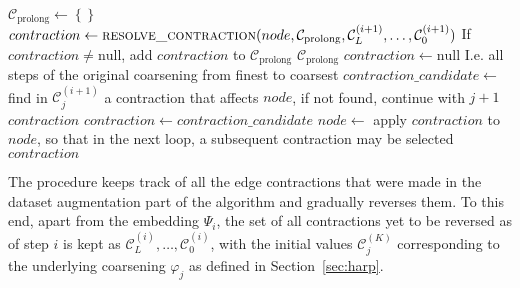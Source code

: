 \begin{algorithm*}
\begin{algorithmic}
    \EndFunction
    \Statex
        \State $ \mathcal{C}_\mathrm{prolong} \gets \left\{ \right\} $
            \State $ contraction \gets \Call{resolve\_contraction}{node, \mathcal{C}_\mathrm{prolong}, \mathcal{C}_L^{(i + 1)}, \dots, \mathcal{C}_0^{(i + 1)}} $
            \State If $ contraction \neq \mathrm{null} $, add $ contraction $ to $ \mathcal{C}_\mathrm{prolong} $
        \EndFor
        \State \Return $ \mathcal{C}_\mathrm{prolong} $
    \EndFunction
    \Statex
        \State $ contraction \gets \mathrm{null} $
         \Comment I.e. all steps of the original coarsening from finest to coarsest
            \State $ contraction\_candidate \gets $ find in $ \mathcal{C}_j^{(i + 1)} $ a contraction that affects $ node $, if not found, continue with $ j + 1 $
                \State \Return $ contraction $
            \EndIf
            \State $ contraction \gets contraction\_candidate $
            \State $ node \gets $ apply $ contraction $ to $ node $, so that in the next loop, a subsequent contraction may be selected
        \EndFor
        \State \Return $ contraction $
    \EndFunction
  \end{algorithmic}
\end{algorithm*}

The procedure keeps track of all the edge contractions that were made in the dataset augmentation part of the algorithm and gradually reverses them. To this end, apart from the embedding \( \Psi_i \), the set of all contractions yet to be reversed as of step \( i \) is kept as \( \mathcal{C}_L^{(i)}, \dots, \mathcal{C}_0^{(i)} \), with the initial values \( \mathcal{C}_j^{(K)} \) corresponding to the underlying coarsening \( \varphi_j \) as defined in Section~\ref{sec:harp}.

